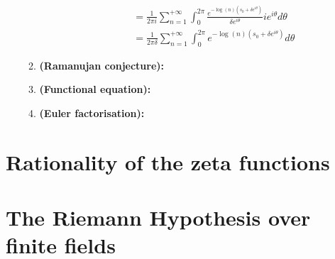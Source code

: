 \begin{example}
\begin{enumerate}
\begin{enumerate}
\begin{enumerate}
$$\begin{aligned}
                                                \\
                                                & = \frac{1}{2\pi i} \sum_{n = 1}^{+\infty} \int_0^{2\pi} \frac{e^{-\log(n) (s_0 + \delta e^{i\theta})}}{\delta e^{i\theta}} ie^{i\theta} d\theta
                                                \\
                                                & = \frac{1}{2\pi \delta} \sum_{n = 1}^{+\infty} \int_0^{2\pi} e^{-\log(n) (s_0 + \delta e^{i\theta})} d\theta
                                            \end{aligned}
                                        $$
                                \end{enumerate}
                            \item \textbf{(Ramanujan conjecture):}
                            \item \textbf{(Functional equation):}
                            \item \textbf{(Euler factorisation):}
                        \end{enumerate}
                \end{enumerate} 
            \end{example}

\section{Rationality of the zeta functions}
    
\section{The Riemann Hypothesis over finite fields}